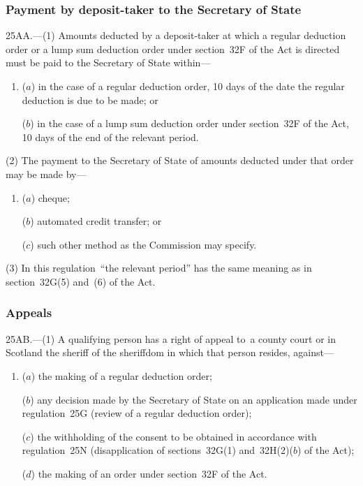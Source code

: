 \documentclass[12pt,a4paper]{article}
\begin{document}
\subsubsection[25AA. Payment by deposit-taker to the 
Secretary of State%
]{Payment by deposit-taker to the 
Secretary of State%
}

25AA.---(1)  Amounts deducted by a deposit-taker at which a regular deduction order or a lump sum deduction order under section~32F of the Act is directed must be paid to the 
Secretary of State  %
within—
\begin{enumerate}\item[]
($a$) in the case of a regular deduction order, 10 days of the date the regular deduction is due to be made; or

($b$) in the case of a lump sum deduction order under section~32F of the Act, 10 days of the end of the relevant period.
\end{enumerate}

(2) The payment to the 
Secretary of State  %
of amounts deducted under that order may be made by—
\begin{enumerate}\item[]
($a$) cheque;

($b$) automated credit transfer; or

($c$) such other method as the Commission may specify.
\end{enumerate}

(3) In this regulation~“the relevant period” has the same meaning as in section~32G(5) and~(6) of the Act.


\subsubsection[25AB. Appeals]{Appeals}

25AB.---(1)  A qualifying person has a right of appeal to~a county court or in Scotland the sheriff of the sheriffdom in which that person resides, against—
\begin{enumerate}\item[]
($a$) the making of a regular deduction order;

($b$) any decision made by the 
Secretary of State  %
on an application made under regulation~25G (review of a regular deduction order);

($c$) the withholding of the consent to be obtained in accordance with regulation~25N (disapplication of sections~32G(1) and~32H(2)($b$)  of the Act);

($d$) the making of an order under section~32F of the Act.
\end{enumerate}
\end{document}
